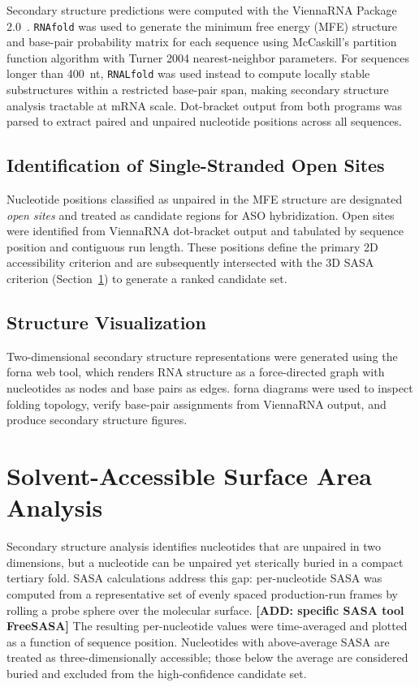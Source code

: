 Secondary structure predictions were computed with the ViennaRNA
Package 2.0~\cite{Lorenz2011}.
\texttt{RNAfold} was used to generate the minimum free energy (MFE)
structure and base-pair probability matrix for each sequence using
McCaskill's partition function algorithm with Turner 2004
nearest-neighbor parameters.
For sequences longer than 400~nt, \texttt{RNALfold} was used instead
to compute locally stable substructures within a restricted base-pair
span, making secondary structure analysis tractable at mRNA scale.
Dot-bracket output from both programs was parsed to extract paired and
unpaired nucleotide positions across all sequences.

\subsection{Identification of Single-Stranded Open Sites}

Nucleotide positions classified as unpaired in the MFE structure are
designated \emph{open sites} and treated as candidate regions for ASO
hybridization.
Open sites were identified from ViennaRNA dot-bracket output and
tabulated by sequence position and contiguous run length.
These positions define the primary 2D accessibility criterion and are
subsequently intersected with the 3D SASA criterion
(Section~\ref{sec:sasa}) to generate a ranked candidate set.

\subsection{Structure Visualization}

Two-dimensional secondary structure representations were generated using
the forna web tool, which renders RNA structure as a force-directed graph
with nucleotides as nodes and base pairs as edges.
forna diagrams were used to inspect folding topology, verify base-pair
assignments from ViennaRNA output, and produce secondary structure
figures.

\section{Solvent-Accessible Surface Area Analysis}
\label{sec:sasa}

Secondary structure analysis identifies nucleotides that are unpaired in
two dimensions, but a nucleotide can be unpaired yet sterically buried
in a compact tertiary fold.
SASA calculations address this gap: per-nucleotide SASA was computed
from a representative set of evenly spaced production-run frames by
rolling a probe sphere over the molecular surface.
\textbf{[ADD: specific SASA tool FreeSASA]}
The resulting per-nucleotide values were time-averaged and plotted as a
function of sequence position.
Nucleotides with above-average SASA are treated as three-dimensionally
accessible; those below the average are considered buried and excluded
from the high-confidence candidate set.

